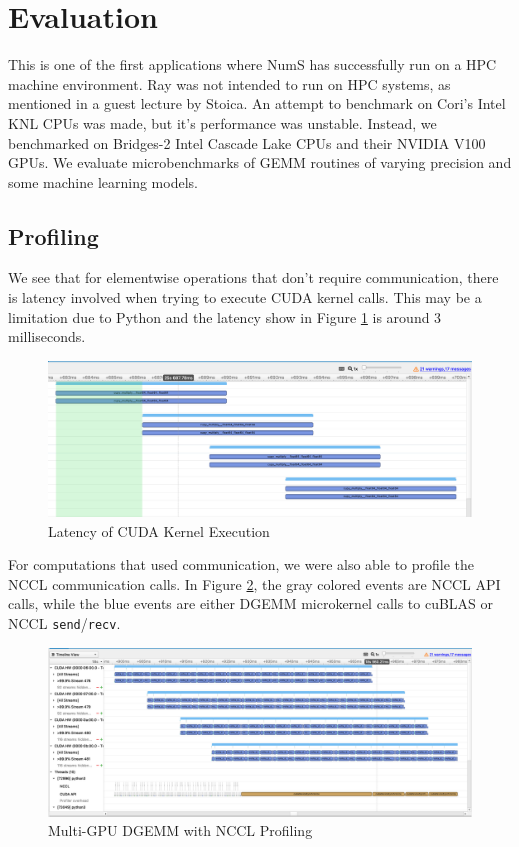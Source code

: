 \documentclass{article}
\begin{document}
\section{Evaluation}
This is one of the first applications where NumS has successfully run on a HPC machine environment. Ray was not intended to run on HPC systems, as mentioned in a guest lecture by Stoica. \cite{ray-lecture} An attempt to benchmark on Cori's Intel KNL CPUs was made, but it's performance was unstable. Instead, we benchmarked on Bridges-2 Intel Cascade Lake CPUs and their NVIDIA V100 GPUs. We evaluate microbenchmarks of GEMM routines of varying precision and some machine learning models.

\subsection{Profiling}
We see that for elementwise operations that don't require communication, there is latency involved when trying to execute CUDA kernel calls. This may be a limitation due to Python and the latency show in Figure \ref{fig:stream} is around 3 milliseconds. 

\begin{figure}
  \centerline{\includegraphics[width=6in]{figures/stream.png}}
  \caption{Latency of CUDA Kernel Execution}
  \label{fig:stream}
\end{figure}

For computations that used communication, we were also able to profile the NCCL communication calls. In Figure \ref{fig:nccl-dgemm}, the gray colored events are NCCL API calls, while the blue events are either DGEMM microkernel calls to cuBLAS or NCCL \verb|send|/\verb|recv|.

\begin{figure}
  \centerline{\includegraphics[width=6in]{hw/latex/figures/nccl-dgemm.png}}
  \caption{Multi-GPU DGEMM with NCCL Profiling}
  \label{fig:nccl-dgemm}
\end{figure}
\end{document}

